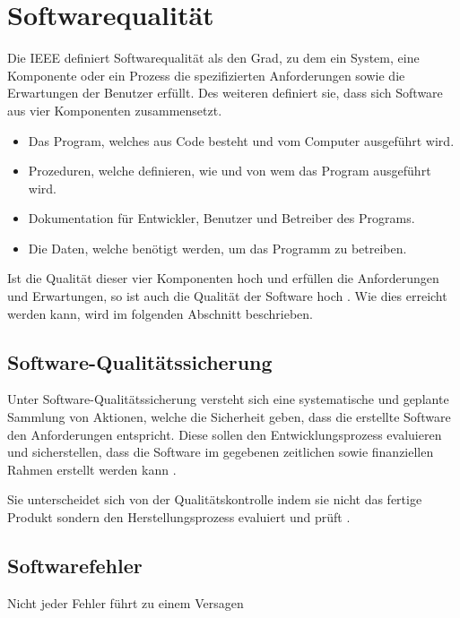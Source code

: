 
\section{Softwarequalität}
Die \ac{IEEE} definiert Softwarequalität als den Grad, zu dem ein System,
eine Komponente oder ein Prozess die spezifizierten Anforderungen sowie die Erwartungen der Benutzer erfüllt.
Des weiteren definiert sie, dass sich Software aus vier Komponenten zusammensetzt.
\begin{itemize}
   \item Das Program, welches aus Code besteht und vom Computer ausgeführt wird.
   \item Prozeduren, welche definieren, wie und von wem das Program ausgeführt wird.
   \item Dokumentation für Entwickler, Benutzer und Betreiber des Programs.
   \item Die Daten, welche benötigt werden, um das Programm zu betreiben.
\end{itemize}
Ist die Qualität dieser vier Komponenten hoch und erfüllen die Anforderungen und Erwartungen,
so ist auch die Qualität der Software hoch \parencite{galin2004software}.
Wie dies erreicht werden kann, wird im folgenden Abschnitt beschrieben.

\subsection{Software-Qualitätssicherung}
Unter Software-Qualitätssicherung versteht sich eine systematische und geplante Sammlung von Aktionen, 
welche die Sicherheit geben, dass die erstellte Software den Anforderungen entspricht.
Diese sollen den Entwicklungsprozess evaluieren und sicherstellen,
dass die Software im gegebenen zeitlichen sowie finanziellen Rahmen erstellt werden kann \parencite{galin2004software}. 

Sie unterscheidet sich von der Qualitätskontrolle indem sie nicht das fertige Produkt sondern den Herstellungsprozess evaluiert und prüft \parencite{galin2004software}.


\subsection{Softwarefehler}
Nicht jeder Fehler führt zu einem Versagen

